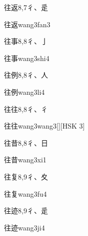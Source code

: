 \begin{entry}{往返}{8,7}{⼻、⾡}
  \begin{phonetics}{往返}{wang3fan3}
  \end{phonetics}
\end{entry}

\begin{entry}{往事}{8,8}{⼻、⼅}
  \begin{phonetics}{往事}{wang3shi4}
  \end{phonetics}
\end{entry}

\begin{entry}{往例}{8,8}{⼻、⼈}
  \begin{phonetics}{往例}{wang3li4}
  \end{phonetics}
\end{entry}

\begin{entry}{往往}{8,8}{⼻、⼻}
  \begin{phonetics}{往往}{wang3wang3}[][HSK 3]
  \end{phonetics}
\end{entry}

\begin{entry}{往昔}{8,8}{⼻、⽇}
  \begin{phonetics}{往昔}{wang3xi1}
  \end{phonetics}
\end{entry}

\begin{entry}{往复}{8,9}{⼻、⼢}
  \begin{phonetics}{往复}{wang3fu4}
  \end{phonetics}
\end{entry}

\begin{entry}{往迹}{8,9}{⼻、⾡}
  \begin{phonetics}{往迹}{wang3ji4}
  \end{phonetics}
\end{entry}

